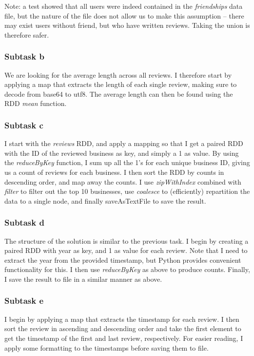 \documentclass[a4paper]{article}
\begin{document}
Note: a test showed that all users were indeed contained in the \emph{friendships} data file, but the nature of the file does not allow us to make this assumption -- there may exist users without friend, but who have written reviews. Taking the union is therefore safer.

\subsubsection{Subtask b}
We are looking for the average length across all reviews. I therefore start by applying a map that extracts the length of each single review, making sure to decode from base64 to utf8. The average length can then be found using the RDD \emph{mean} function.

\subsubsection{Subtask c}
I start with the \emph{reviews} RDD, and apply a mapping so that I get a paired RDD with the ID of the reviewed business as key, and simply a 1 as value. By using the \emph{reduceByKey} function, I sum up all the 1's for each unique business ID, giving us a count of reviews for each business. I then sort the RDD by counts in descending order, and map away the counts. I use \emph{zipWithIndex} combined with \emph{filter} to filter out the top 10 businesses, use \emph{coalesce} to (efficiently) repartition the data to a single node, and finally saveAsTextFile to save the result.

\subsubsection{Subtask d}
The structure of the solution is similar to the previous task. I begin by creating a paired RDD with year as key, and 1 as value for each review. Note that I need to extract the year from the provided timestamp, but Python provides convenient functionality for this. I then use \emph{reduceByKey} as above to produce counts. Finally, I save the result to file in a similar manner as above.

\subsubsection{Subtask e}
I begin by applying a map that extracts the timestamp for each review. I then sort the review in ascending and descending order and take the first element to get the timestamp of the first and last review, respectively. For easier reading, I apply some formatting to the timestamps before saving them to file.
\end{document}
